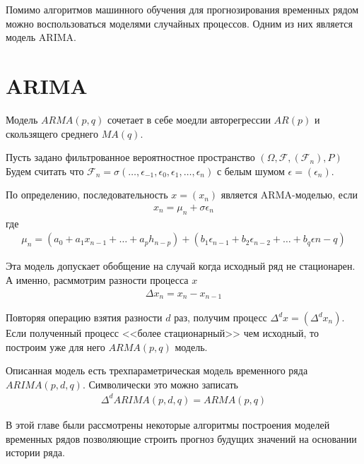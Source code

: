 Помимо алгоритмов машинного обучения для прогнозирования временных рядом можно воспользоваться моделями случайных процессов.
Одним из них является модель ARIMA. 

\section{ARIMA}

Модель $ARMA(p, q)$ сочетает в себе моедли авторегрессии $AR(p)$ и скользящего среднего $MA(q)$.

Пусть задано фильтрованное вероятностное пространство $\left( \Omega, \mathscr{F}, (\mathscr{F}_n), P \right)$
Будем считать что $\mathscr{F}_n = \sigma(\dots, \epsilon_{-1}, \epsilon_0, \epsilon_1, \dots, \epsilon_n)$ с белым шумом $\epsilon = (\epsilon_n)$.

По определению, последовательность $x = (x_n)$ является ARMA-моделью, если 
\begin{align}
	x_n = \mu_n + \sigma \epsilon_n
\end{align}
где
\begin{align}
	\mu_n = \left(a_0 + a_1 x_{n-1} + \dots + a_p h_{n-p} \right) +
	\left(b_1 \epsilon_{n-1} + b_2 \epsilon_{n-2} + \dots + b_q \epsilon{n - q} \right)
\end{align}

Эта модель допускает обобщение на случай когда исходный ряд не стационарен. А именно, расммотрим разности процесса $x$
\begin{align}
	\Delta x_n = x_n - x_{n-1}
\end{align}

Повторяя операцию взятия разности $d$ раз, получим процесс $\Delta^d x = (\Delta^d x_n)$. Если полученный процесс <<более стационарный>>
чем исходный, то построим уже для него $ARMA(p, q)$ модель.

Описанная модель есть трехпараметрическая модель временного ряда $ARIMA(p, d, q)$. Символически это можно записать
\begin{align}
	\Delta^d ARIMA(p, d, q) = ARMA(p, q)
\end{align}

В этой главе были рассмотрены некоторые алгоритмы построения моделей временных рядов позволяющие строить прогноз будущих значений на основании
истории ряда.